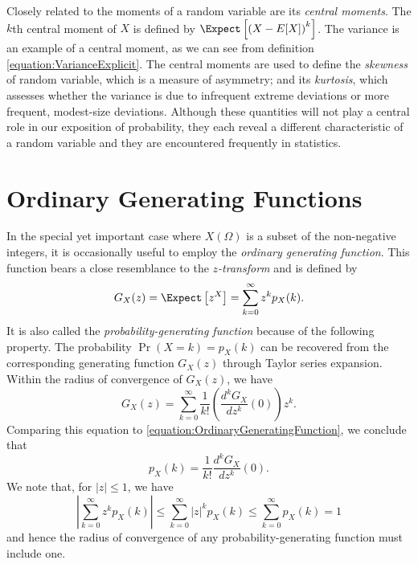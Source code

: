 Closely related to the moments of a random variable are its \emph{central moments}. 
The $k$th central moment of $X$ is defined by $\Expect \left[ \left( X - E[X] \right)^k \right]$.
The variance is an example of a central moment, as we can see from definition \eqref{equation:VarianceExplicit}.
The central moments are used to define the \emph{skewness} of random variable, which is a measure of asymmetry; and its \emph{kurtosis}, which assesses whether the variance is due to infrequent extreme deviations or more frequent, modest-size deviations.
Although these quantities will not play a central role in our exposition of probability, they each reveal a different characteristic of a random variable and they are encountered frequently in statistics. 

\iffalse
\section{Ordinary Generating Functions}
\label{section:OrdinaryGeneratingFunctions}

In the special yet important case where $X(\Omega)$ is a subset of the non-negative integers, it is occasionally useful to employ the \emph{ordinary generating function}. 
This function bears a close resemblance to the \emph{$z$-transform} and is defined by 
\begin{equation} \label{equation:OrdinaryGeneratingFunction}
G_X(z) = \Expect \left[ z^X \right] = \sum_{k=0}^{\infty} z^k p_X (k) .
\end{equation}
It is also called the \emph{probability-generating function} because of the following property. 
The probability $\Pr (X = k) = p_X(k)$ can be recovered from the corresponding generating function $G_X (z)$ through Taylor series expansion.
Within the radius of convergence of $G_X(z)$, we have
\begin{equation*}
G_X(z) = \sum_{k=0}^{\infty} \frac{1}{k!} \left( \frac{d^k G_X}{dz^k}(0) \right) z^k .
\end{equation*}
Comparing this equation to \eqref{equation:OrdinaryGeneratingFunction}, we conclude that
\begin{equation*}
p_X(k) = \frac{1}{k!} \frac{d^k G_X}{dz^k} (0) .
\end{equation*}
We note that, for $|z| \leq 1$, we have
\begin{equation*}
\left| \sum_{k=0}^{\infty} z^k p_X(k) \right|
\leq \sum_{k=0}^{\infty} |z|^k p_X(k)
\leq \sum_{k=0}^{\infty} p_X(k) = 1
\end{equation*}
and hence the radius of convergence of any probability-generating function must include one.

